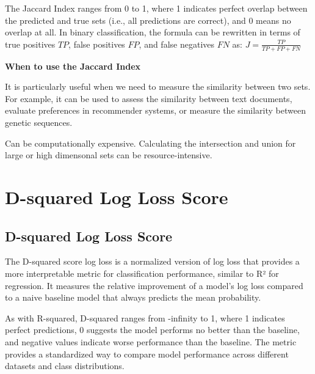 The Jaccard Index ranges from 0 to 1, where 1 indicates perfect overlap between the predicted and true sets (i.e., all predictions are correct),
and 0 means no overlap at all. In binary classification, the formula can be rewritten in terms of true positives $TP$, false positives $FP$, and false negatives
$FN$ as: $J = \frac{TP}{TP + FP + FN}$

\textbf{When to use the Jaccard Index}

It is particularly useful when we need to measure the similarity between two sets. For example, it can be used to assess the similarity between text documents,
evaluate preferences in recommender systems, or measure the similarity between genetic sequences.

{
    \item Can be computationally expensive. Calculating the intersection and union for large or high dimensonal sets can be resource-intensive.
}


\clearpage
\thispagestyle{classificationstyle}
\section{D-squared Log Loss Score}
\subsection{D-squared Log Loss Score}

The D-squared score log loss is a normalized version of log loss that provides a more interpretable metric for classification performance, similar to R² for regression.
It measures the relative improvement of a model's log loss compared to a naive baseline model that always predicts the mean probability.

% 
% 

As with R-squared, D-squared ranges from -infinity to 1, where 1 indicates perfect predictions, 0 suggests the model performs no better than the baseline, and negative values indicate
worse performance than the baseline. The metric provides a standardized way to compare model performance across different datasets and class distributions.


